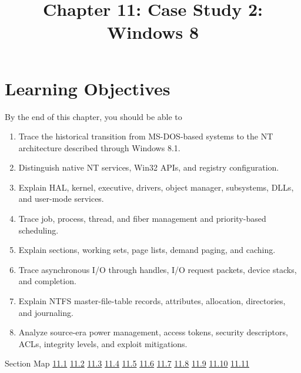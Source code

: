 \documentclass[10pt,letterpaper]{article}
\title{Chapter 11: Case Study 2: Windows 8}
\author{}
\date{}
\begin{document}
\maketitle
\section*{Learning Objectives}
\begin{studybox}{By the end of this chapter, you should be able to}
\begin{enumerate}
  \item Trace the historical transition from MS-DOS-based systems to the NT architecture described through Windows 8.1.
  \item Distinguish native NT services, Win32 APIs, and registry configuration.
  \item Explain HAL, kernel, executive, drivers, object manager, subsystems, DLLs, and user-mode services.
  \item Trace job, process, thread, and fiber management and priority-based scheduling.
  \item Explain sections, working sets, page lists, demand paging, and caching.
  \item Trace asynchronous I/O through handles, I/O request packets, device stacks, and completion.
  \item Explain NTFS master-file-table records, attributes, allocation, directories, and journaling.
  \item Analyze source-era power management, access tokens, security descriptors, ACLs, integrity levels, and exploit mitigations.
\end{enumerate}
\end{studybox}

\begin{studybox}{Section Map}
\hyperlink{sec-11-1}{11.1} \quad \hyperlink{sec-11-2}{11.2} \quad \hyperlink{sec-11-3}{11.3} \quad \hyperlink{sec-11-4}{11.4} \quad \hyperlink{sec-11-5}{11.5} \quad \hyperlink{sec-11-6}{11.6} \quad \hyperlink{sec-11-7}{11.7} \quad \hyperlink{sec-11-8}{11.8} \quad \hyperlink{sec-11-9}{11.9} \quad \hyperlink{sec-11-10}{11.10} \quad \hyperlink{sec-11-11}{11.11}
\end{studybox}
\end{document}
